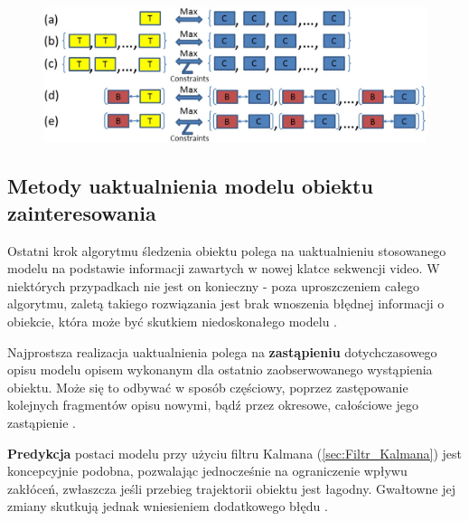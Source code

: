 \begin{figure}[!htb]
	\begin{center}
		\includegraphics[width=12cm]{images/target_tracking_methods.png}
	\end{center}	
\label{fig:Metody_sledzenia_obiektow_na_obrazach}
\end{figure}

\subsection{Metody uaktualnienia modelu obiektu zainteresowania}
\label{subsec:Metody_uaktualnienia_modelu_obiektu_zainteresowania}

Ostatni krok algorytmu śledzenia obiektu polega na uaktualnieniu stosowanego modelu na podstawie informacji zawartych w nowej klatce sekwencji video. W niektórych przypadkach nie jest on konieczny - poza uproszczeniem całego algorytmu, zaletą takiego rozwiązania jest brak wnoszenia błędnej informacji o obiekcie, która może być skutkiem niedoskonałego modelu \cite{Smeulders2010}.

Najprostsza realizacja uaktualnienia polega na \textbf{zastąpieniu} dotychczasowego opisu modelu opisem wykonanym dla ostatnio zaobserwowanego wystąpienia obiektu. Może się to odbywać w sposób częściowy, poprzez zastępowanie kolejnych fragmentów opisu nowymi, bądź przez okresowe, całościowe jego zastąpienie \cite{Smeulders2010}. 

\textbf{Predykcja} postaci modelu przy użyciu filtru Kalmana (\ref{sec:Filtr_Kalmana}) jest koncepcyjnie podobna, pozwalając jednocześnie na ograniczenie wpływu zakłóceń, zwłaszcza jeśli przebieg trajektorii obiektu jest łagodny. Gwałtowne jej zmiany skutkują jednak wniesieniem dodatkowego błędu \cite{Smeulders2010}. 

